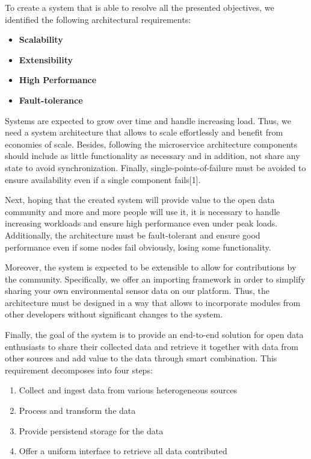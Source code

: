 To create a system that is able to resolve all the presented objectives,
we identified the following architectural requirements:

\begin{itemize}
\tightlist
\item
  \textbf{Scalability}
\item
  \textbf{Extensibility}
\item
  \textbf{High Performance}
\item
  \textbf{Fault-tolerance}
\end{itemize}

Systems are expected to grow over time and handle increasing load. Thus,
we need a system architecture that allows to scale effortlessly and
benefit from economies of scale. Besides, following the microservice
architecture components should include as little functionality as
necessary and in addition, not share any state to avoid synchronization.
Finally, single-points-of-failure must be avoided to ensure availability
even if a single component fails{[}1{]}.

Next, hoping that the created system will provide value to the open data
community and more and more people will use it, it is necessary to
handle increasing workloads and ensure high performance even under peak
loads. Additionally, the architecture must be fault-tolerant and ensure
good performance even if some nodes fail obviously, losing some
functionality.

Moreover, the system is expected to be extensible to allow for
contributions by the community. Specifically, we offer an importing
framework in order to simplify sharing your own environmental sensor
data on our platform. Thus, the architecture must be designed in a way
that allows to incorporate modules from other developers without
significant changes to the system.

Finally, the goal of the system is to provide an end-to-end solution for
open data enthusiasts to share their collected data and retrieve it
together with data from other sources and add value to the data through
smart combination. This requirement decomposes into four steps:

\begin{enumerate}
\def\labelenumi{\arabic{enumi}.}
\tightlist
\item
  Collect and ingest data from various heterogeneous sources
\item
  Process and transform the data
\item
  Provide persistend storage for the data
\item
  Offer a uniform interface to retrieve all data contributed
\end{enumerate}

